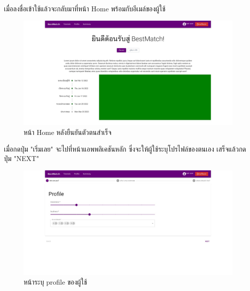 เมื่อลงชื่อเข้าใช้แล้วจะกลับมาที่หน้า Home พร้อมกับอีเมล์ของผู้ใช้
\begin{figure}[!ht]
  \begin{center}
    \includegraphics[width=\linewidth]{photo/web/student/home-auth.jpeg}
  \end{center}
  \caption{หน้า Home หลังยืนยันตัวตนสำเร็จ}
\end{figure}
%
\newline
เมื่อกดปุ่ม "เริ่มเลย" จะไปที่หน้าแอพพลิเคชันหลัก ซึ่งจะให้ผู้ใช้ระบุโปรไฟล์ของตนเอง
เสร็จแล้วกดปุ่ม "NEXT"
\begin{figure}[h]
  \begin{center}
    \includegraphics[width=\linewidth]{photo/web/student/profile-def.jpeg}
  \end{center}
  \caption{หน้าระบุ profile ของผู้ใช้}
\end{figure}
\newpage

